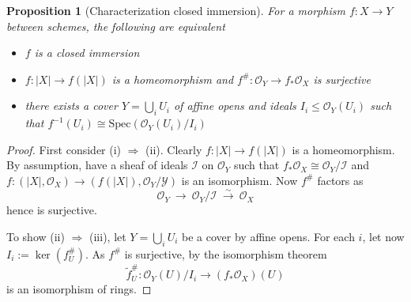 \documentclass{scrartcl}
\newcommand{\Spec}{\mathrm{Spec}}
\renewcommand{\O}{\mathcal{O}}
\newtheorem{prop}{Proposition}[section]
\theoremstyle{definition}
\begin{document}
\begin{prop}[Characterization closed immersion]
    For a morphism $f: X \to Y$ between schemes, the following are equivalent
    \begin{itemize}
        \item $f$ is a closed immersion
        \item $f: |X| \to f(|X|)$ is a homeomorphism and $f^\#: \O_Y \to f_*\O_X$ is surjective
        \item there exists a cover $Y = \bigcup_i U_i$ of affine opens and ideals $I_i \leq \O_Y(U_i)$ such that $f^{-1}(U_i) \cong \Spec(\O_Y(U_i)/I_i)$
    \end{itemize}
\end{prop}
\begin{proof}
    First consider (i) $\Rightarrow$ (ii).
    Clearly $f: |X| \to f(|X|)$ is a homeomorphism.
    By assumption, have a sheaf of ideals $\mathcal{I}$ on $\O_Y$ such that $f_*\O_X \cong \O_Y/\mathcal{I}$ and $f: (|X|, \O_X) \to (f(|X|), \O_Y/\mathcal{Y})$ is an isomorphism.
    Now $f^\#$ factors as
    \begin{equation*}
        \O_Y \ \to \ \O_Y / \mathcal{I} \ \overset{\sim}{\to} \ \O_X
    \end{equation*}
    hence is surjective.

    To show (ii) $\Rightarrow$ (iii), let $Y = \bigcup_i U_i$ be a cover by affine opens.
    For each $i$, let now $I_i := \ker(f^\#_U)$.
    As $f^\#$ is surjective, by the isomorphism theorem
    \begin{equation*}
        \tilde{f}^\#_U: \O_Y(U) / I_i \to (f_*\O_X)(U)
    \end{equation*}
    is an isomorphism of rings.
\end{proof}
\end{document}
